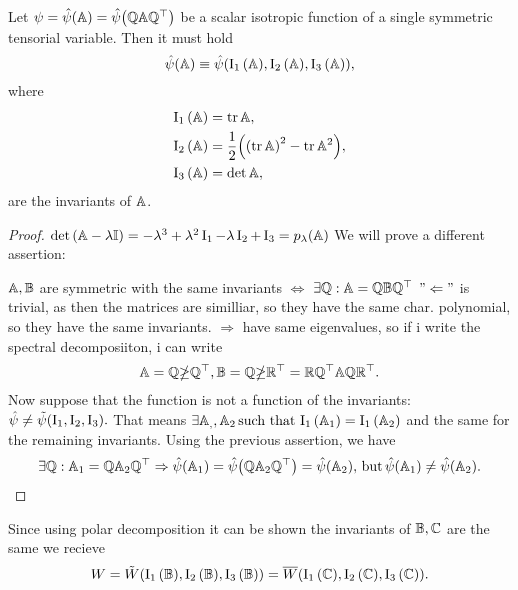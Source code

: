 \documentclass[reqno, a4paper]{article}
\begin{document}
\begin{theorem}
	Let $\psi = \hat{\psi}\qty(\mathbb{A}) = \hat{\psi}\qty(\mathbb{Q}\mathbb{A}\mathbb{Q}^\top)$ be a scalar isotropic function of a single symmetric tensorial variable. Then it must hold
	\[
		\hat{\psi}\qty(\mathbb{A}) \equiv \hat{\psi}\qty(\operatorname{I_1}\qty(\mathbb{A}),\operatorname{I_2}\qty(\mathbb{A}),\operatorname{I_3}\qty(\mathbb{A})),
	\]	
where
\begin{align*}
	\operatorname{I_1}\qty(\mathbb{A}) &= \tr \mathbb{A},\\
	\operatorname{I_2}\qty(\mathbb{A}) &= \frac{1}{2}\qty(\qty(\tr \mathbb{A})^{2}-\tr \mathbb{A}^{2}),\\
	\operatorname{I_3}\qty(\mathbb{A}) &= \det \mathbb{A},
\end{align*}
are the invariants of $\mathbb{A}$.
\end{theorem}

\begin{proof}
    $\det\qty(\mathbb{A}-\lambda \mathbb{I}) = -\lambda^{3} + \lambda^{2} \operatorname{I_1} - \lambda \operatorname{I_2} + \operatorname{I_3} = p_{\lambda}\qty(\mathbb{A})$
    We will prove a different assertion:

    $\mathbb{A}, \mathbb{B}$ are symmetric with the same invariants $\Leftrightarrow$  $\exists \mathbb{Q}: \mathbb{A} = \mathbb{Q} \mathbb{B} \mathbb{Q}^\top$ 
    $"\Leftarrow"$ is trivial, as then the matrices are similliar, so they have the same char. polynomial, so they have the same invariants.
    $\Rightarrow$ have same eigenvalues, so if i write the spectral decomposiiton, i can write
    \[
	    \mathbb{A} = \mathbb{Q} \mathbb{\Lambda} \mathbb{Q}^\top, \mathbb{B} = \mathbb{Q} \mathbb{\Lambda}\mathbb{R}^\top = \mathbb{R}\mathbb{Q}^\top \mathbb{A} \mathbb{Q}\mathbb{R}^\top.
    \]
    Now suppose that the function is not a function of the invariants: $\hat{\psi} \neq \tilde{\psi}\qty(\operatorname{I_1},\operatorname{I_2},\operatorname{I_3}).$ That means $\exists \mathbb{A}_,, \mathbb{A}_2 \, \text{such that} \, \operatorname{I_1}\qty(\mathbb{A}_1) = \operatorname{I_1}\qty(\mathbb{A}_2)$ and the same for the remaining invariants. Using the previous assertion, we have
    \[
	    \exists \mathbb{Q}: \mathbb{A}_1 = \mathbb{Q}\mathbb{A}_2 \mathbb{Q}^\top \Rightarrow \hat{\psi}\qty(\mathbb{A}_1) = \hat{\psi}\qty(\mathbb{Q}\mathbb{A}_2 \mathbb{Q}^\top) = \hat{\psi}\qty(\mathbb{A}_2), \, \text{but} \, \hat{\psi}\qty(\mathbb{A}_1) \neq \hat{\psi}\qty(\mathbb{A}_2).
    \]
\end{proof}
Since using polar decomposition it can be shown the invariants of $\mathbb{B}, \mathbb{C}$ are the same we recieve
\[
	W = \tilde{W}(\operatorname{I_1}\qty(\mathbb{B}), \operatorname{I_2}\qty(\mathbb{B}), \operatorname{I_3}\qty(\mathbb{B})) = \overline{W}\qty(\operatorname{I_1}\qty(\mathbb{C}), \operatorname{I_2}\qty(\mathbb{C}), \operatorname{I_3}\qty(\mathbb{C})).
\]
\end{document}
